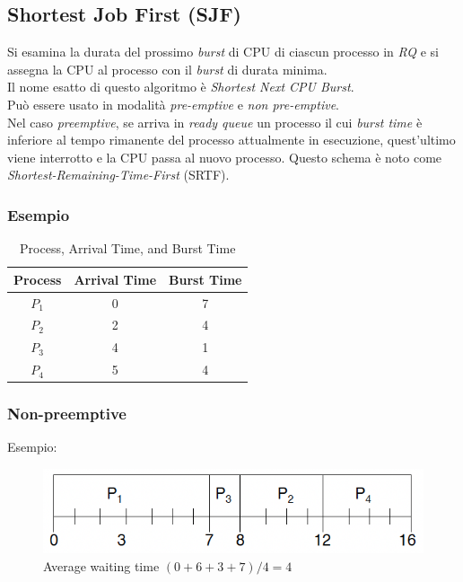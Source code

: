 \subsection{Shortest Job First (SJF)}
Si esamina la durata del prossimo \textit{burst} di CPU di ciascun processo in \textit{RQ} e si assegna la CPU al processo con il \textit{burst} di durata minima.\\
Il nome esatto di questo algoritmo è \textit{Shortest Next CPU Burst}.\\
 Può essere usato in modalità \textit{pre-emptive} e \textit{non pre-emptive}.\\
Nel caso \textit{preemptive}, se arriva in \textit{ready queue} un processo il cui \textit{burst time} è inferiore al tempo rimanente del processo attualmente in esecuzione, quest'ultimo viene interrotto e la CPU passa al nuovo processo. Questo schema è noto come \textit{Shortest-Remaining-Time-First} (SRTF).\\
\subsubsection{Esempio}
\begin{table}[ht]
    \centering
    \begin{tabular}{|c|c|c|}
        \hline
        \rowcolor[gray]{0.6} 
        Process & Arrival Time & Burst Time \\
        \hline
        $P_1$ & 0 & 7 \\
        $P_2$ & 2 & 4 \\
        $P_3$ & 4 & 1 \\
        $P_4$ & 5 & 4 \\
        \hline
    \end{tabular}
    \caption{Process, Arrival Time, and Burst Time}
    \label{tab:process_times}
\end{table}

\subsubsection{Non-preemptive}
Esempio:
\begin{figure}[ht]
    \centering
    \includegraphics[width=0.2\linewidth]{images/SJF_nonpreemptive.png}
    \caption{Average waiting time $(0 + 6 + 3 + 7)/4 = 4$}
\end{figure}

